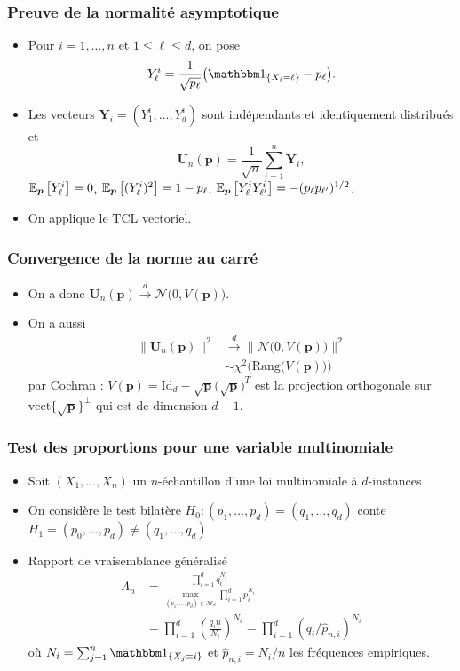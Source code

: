 \begin{frame}
\frametitle{Preuve de la normalité asymptotique}
\begin{itemize}
\item Pour $i=1,\ldots, n$ et $1 \leq \ell \leq d$, on pose
$$Y_\ell^i=\frac{1}{\sqrt{p_\ell}}\big(\indi{X_i=\ell}-p_\ell\big).$$
\item Les vecteurs ${\boldsymbol Y}_i=(Y_1^i,\ldots, Y_d^i)$ sont \alert{indépendants et identiquement distribués} et
$${\boldsymbol U}_n(\boldsymbol{p}) = \frac{1}{\sqrt{n}}\sum_{i = 1}^n {\boldsymbol Y}_i,$$
$\operatorname{{\mathbb E}}_{\boldsymbol{p}}\big[Y_\ell^i\big]=0$, $\operatorname{{\mathbb E}}_{\boldsymbol{p}}\big[(Y_\ell^i)^2\big]=1-p_\ell$, $\operatorname{{\mathbb E}}_{\boldsymbol{p}}\big[Y_\ell^iY_{\ell'}^i \big]=-(p_\ell p_{\ell'})^{1/2}$.
\item \alert{On applique le TCL vectoriel}.
\end{itemize}
\end{frame}

\begin{frame}
\frametitle{Convergence de la norme au carré}
\begin{itemize}
\item On a donc ${\boldsymbol U}_n(\boldsymbol{p}) \stackrel{d}{\longrightarrow} {\mathcal N}\big(0,V(\boldsymbol{p})\big)$.
\item On a aussi
\begin{align*}
\|{\boldsymbol U}_n(\boldsymbol{p}) \|^2 & \stackrel{d}{\longrightarrow} \| {\mathcal N}\big(0,V(\boldsymbol{p})\big)\|^2 \\
& \sim \chi^2\big(\mathrm{Rang}\big(V(\boldsymbol{p})\big)\big)
\end{align*}
par \alert{Cochran} :  $V(\boldsymbol{p}) = \mathrm{Id}_d-\sqrt{\boldsymbol{p}}\big(\sqrt{\boldsymbol{p}}\big)^T$ est la projection orthogonale sur $\mathrm{vect}\{\sqrt{\boldsymbol{p}}\}^\perp$ qui est de dimension $d-1$.
\end{itemize}
\end{frame}


\begin{frame}
\frametitle{Test des proportions pour une variable multinomiale}
\begin{itemize}
\item Soit $(X_1,\dots,X_n)$ un $n$-échantillon d'une loi multinomiale à $d$-instances
\item On considère le test bilatère  $H_0: (p_1,\dots,p_d)= (q_1,\dots,q_d)$ conte $H_1= (p_0,\dots,p_d) \ne (q_1,\dots,q_d)$
\item \alert{Rapport de vraisemblance généralisé}
\begin{align*}
\Lambda_n
&= \frac{ \prod_{i=1}^d q_i^{N_i}}{\max_{(p_1,\dots,p_d) \in \mathcal{M}_d} \prod_{i=1}^d p_i^{N_i} } \\
&= \prod_{i=1}^d \left( \frac{q_i n}{ N_i} \right)^{N_i} = \prod_{i=1}^d (q_i/ \hat{p}_{n,i})^{N_i}
\end{align*}
où $N_i= \sum_{j=1}^n \indi{X_j=i}$  et $\hat{p}_{n,i}= N_i/n$ les fréquences empiriques.
\end{itemize}
\end{frame}

